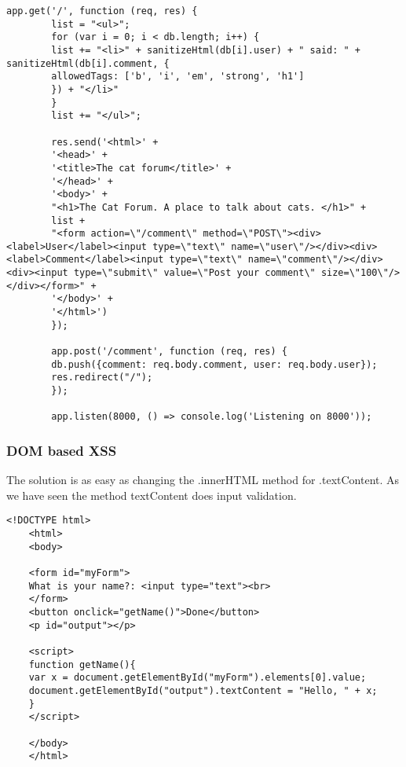 \begin{Answer}[ref={websec-xss-prevention}]
\begin{lstlisting}[style=JavaScript]
		app.get('/', function (req, res) {
		list = "<ul>";
		for (var i = 0; i < db.length; i++) {
		list += "<li>" + sanitizeHtml(db[i].user) + " said: " + sanitizeHtml(db[i].comment, {
		allowedTags: ['b', 'i', 'em', 'strong', 'h1']
		}) + "</li>"
		}
		list += "</ul>";
		
		res.send('<html>' +
		'<head>' +
		'<title>The cat forum</title>' +
		'</head>' +
		'<body>' +
		"<h1>The Cat Forum. A place to talk about cats. </h1>" +
		list +
		"<form action=\"/comment\" method=\"POST\"><div><label>User</label><input type=\"text\" name=\"user\"/></div><div><label>Comment</label><input type=\"text\" name=\"comment\"/></div><div><input type=\"submit\" value=\"Post your comment\" size=\"100\"/></div></form>" +
		'</body>' +
		'</html>')
		});
		
		app.post('/comment', function (req, res) {
		db.push({comment: req.body.comment, user: req.body.user});
		res.redirect("/");
		});
		
		app.listen(8000, () => console.log('Listening on 8000'));
		\end{lstlisting}
	\subsubsection{DOM based XSS}
	The solution is as easy as changing the .innerHTML method for .textContent. As we have seen the method textContent does input validation.
	\begin{lstlisting}[style=JavaScript]<!DOCTYPE html>
	<html>
	<body>
	
	<form id="myForm">
	What is your name?: <input type="text"><br>
	</form>
	<button onclick="getName()">Done</button>
	<p id="output"></p>
	
	<script>
	function getName(){
	var x = document.getElementById("myForm").elements[0].value;
	document.getElementById("output").textContent = "Hello, " + x;
	}
	</script>
	
	</body>
	</html>
	\end{lstlisting}
\end{Answer}